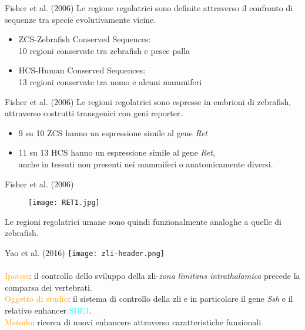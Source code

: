 \documentclass{beamer}
\newcommand{\hh}[1]{\textcolor{orange}{#1}}
\begin{document}
    \begin{frame}[plain]{Fisher et al. (2006)}
        Le regione regolatrici sono definite attraverso il confronto di sequenze
        tra specie evolutivamente vicine.
        \begin{itemize}
            \item ZCS-Zebrafish Conserved Sequences:\\
            10 regioni conservate tra zebrafish e pesce palla
            \item HCS-Human Conserved Sequences:\\
            13 regioni conservate tra uomo e alcuni mammiferi
        \end{itemize}
    \end{frame}


    \begin{frame}[plain]{Fisher et al. (2006)}
        Le regioni regolatrici sono espresse in embrioni di zebrafish,
        attraverso costrutti transgenici con geni reporter.
        \begin{itemize}
            \item 9 su 10 ZCS hanno un espressione simile al gene \emph{Ret}
            \item 11 su 13 HCS hanno un espressione simile al gene \emph{Ret},\\
            anche in tessuti non presenti nei mammiferi o anatomicamente diversi.
        \end{itemize}
    \end{frame}


    \begin{frame}[plain]{Fisher et al. (2006)}
        \begin{figure}
            \texttt{[image: RET1.jpg]}
        \end{figure}
        Le regioni regolatrici umane sono quindi funzionalmente analoghe a quelle di zebrafish.
    \end{frame}


    \begin{frame}[plain]{Yao et al. (2016)}
        \texttt{[image: zli-header.png]}\\~\\
        \hh{Ipotesi}: il controllo dello sviluppo della zli-\emph{zona limitans intrathalamica}
        precede la comparsa dei vertebrati.\\
        \hh{Oggetto di studio}: il sistema di controllo della zli e in particolare il gene \emph{Ssh}
        e il relativo enhancer \textcolor{cyan}{SBE1}.\\
        \hh{Metodo}: ricerca di nuovi enhancers attraverso caratteristiche funzionali
    \end{frame}
\end{document}
